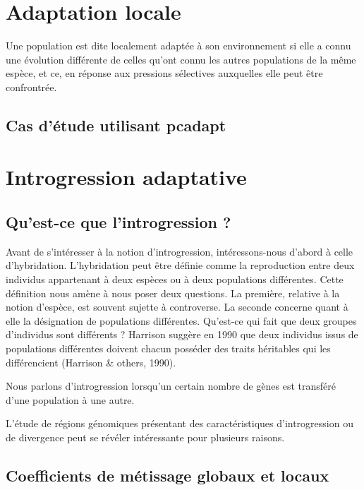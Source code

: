 \documentclass[12pt,twoside]{reedthesis}
\begin{document}
  \chapter{Adaptation locale}\label{adaptation-locale}
  
  Une population est dite localement adaptée à son environnement si elle a
  connu une évolution différente de celles qu'ont connu les autres
  populations de la même espèce, et ce, en réponse aux pressions
  sélectives auxquelles elle peut être confrontrée.
  
  \section{Cas d'étude utilisant
  pcadapt}\label{cas-detude-utilisant-pcadapt}
  
  \chapter{Introgression adaptative}\label{introgression-adaptative}
  
  \section{Qu'est-ce que l'introgression
  ?}\label{quest-ce-que-lintrogression}
  
  Avant de s'intéresser à la notion d'introgression, intéressons-nous
  d'abord à celle d'hybridation. L'hybridation peut être définie comme la
  reproduction entre deux individus appartenant à deux espèces ou à deux
  populations différentes. Cette définition nous amène à nous poser deux
  questions. La première, relative à la notion d'espèce, est souvent
  sujette à controverse. La seconde concerne quant à elle la désignation
  de populations différentes. Qu'est-ce qui fait que deux groupes
  d'individus sont différents ? Harrison suggère en 1990 que deux
  individus issus de populations différentes doivent chacun posséder des
  traits héritables qui les différencient (Harrison \& others, 1990).
  
  Nous parlons d'introgression lorsqu'un certain nombre de gènes est
  transféré d'une population à une autre.
  
  L'étude de régions génomiques présentant des caractéristiques
  d'introgression ou de divergence peut se révéler intéressante pour
  plusieurs raisons.
  
  \section{Coefficients de métissage globaux et
  locaux}\label{coefficients-de-metissage-globaux-et-locaux}
  
\end{document}
